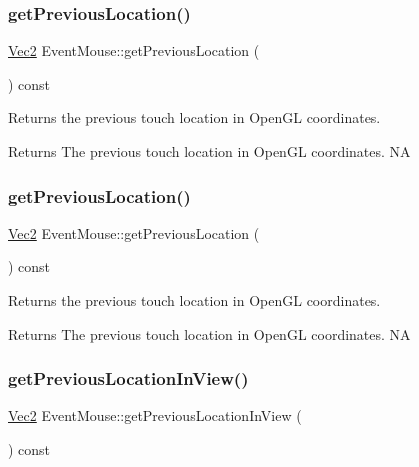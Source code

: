 \subsubsection{\texorpdfstring{get\+Previous\+Location()}{getPreviousLocation()}\hspace{0.1cm}{\footnotesize\ttfamily [1/2]}}
{\footnotesize\ttfamily \hyperlink{classVec2}{Vec2} Event\+Mouse\+::get\+Previous\+Location (\begin{DoxyParamCaption}{ }\end{DoxyParamCaption}) const}

Returns the previous touch location in Open\+GL coordinates.

\begin{DoxyReturn}{Returns}
The previous touch location in Open\+GL coordinates.  NA 
\end{DoxyReturn}
\mbox{\label{classEventMouse_a3efc2e751febf59f3068305f90cb1acc}} 
\subsubsection{\texorpdfstring{get\+Previous\+Location()}{getPreviousLocation()}\hspace{0.1cm}{\footnotesize\ttfamily [2/2]}}
{\footnotesize\ttfamily \hyperlink{classVec2}{Vec2} Event\+Mouse\+::get\+Previous\+Location (\begin{DoxyParamCaption}{ }\end{DoxyParamCaption}) const}

Returns the previous touch location in Open\+GL coordinates.

\begin{DoxyReturn}{Returns}
The previous touch location in Open\+GL coordinates.  NA 
\end{DoxyReturn}
\mbox{\label{classEventMouse_af6c5fce01a5275995b993bd4f315ab60}} 
\subsubsection{\texorpdfstring{get\+Previous\+Location\+In\+View()}{getPreviousLocationInView()}\hspace{0.1cm}{\footnotesize\ttfamily [1/2]}}
{\footnotesize\ttfamily \hyperlink{classVec2}{Vec2} Event\+Mouse\+::get\+Previous\+Location\+In\+View (\begin{DoxyParamCaption}{ }\end{DoxyParamCaption}) const}

